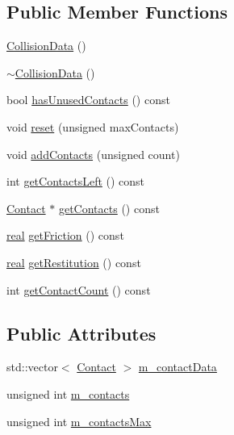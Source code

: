 \subsection*{Public Member Functions}
\begin{DoxyCompactItemize}
\item 
\mbox{\hyperlink{classrum_1_1_collision_data_a048dec3ce6286f05820891677d7ea538}{Collision\+Data}} ()
\item 
\mbox{\hyperlink{classrum_1_1_collision_data_a265a1471d472b1ef5994d3ede901643b}{$\sim$\+Collision\+Data}} ()
\item 
bool \mbox{\hyperlink{classrum_1_1_collision_data_a00b88f3e835fc6b3dd48739c518aa66f}{has\+Unused\+Contacts}} () const
\item 
void \mbox{\hyperlink{classrum_1_1_collision_data_ae49fabbf40a855eab3ce0003aa418253}{reset}} (unsigned max\+Contacts)
\item 
void \mbox{\hyperlink{classrum_1_1_collision_data_a6774145a5f81c49c30c5d0c7954d35d5}{add\+Contacts}} (unsigned count)
\item 
int \mbox{\hyperlink{classrum_1_1_collision_data_a2b3dcbec102ae7affab46ba19c7c4eb7}{get\+Contacts\+Left}} () const
\item 
\mbox{\hyperlink{classrum_1_1_contact}{Contact}} $\ast$ \mbox{\hyperlink{classrum_1_1_collision_data_a0b9d69450fbefbb28b0d427793cccc26}{get\+Contacts}} () const
\item 
\mbox{\hyperlink{namespacerum_a7e8cca23573d5eaead0f138cbaa4862c}{real}} \mbox{\hyperlink{classrum_1_1_collision_data_a917290357ac710e3d4e1bfce4d040495}{get\+Friction}} () const
\item 
\mbox{\hyperlink{namespacerum_a7e8cca23573d5eaead0f138cbaa4862c}{real}} \mbox{\hyperlink{classrum_1_1_collision_data_aae54080198ebe0e4700142f0ad03b344}{get\+Restitution}} () const
\item 
int \mbox{\hyperlink{classrum_1_1_collision_data_a77b0f7209d6709f8a2041722428f56d5}{get\+Contact\+Count}} () const
\end{DoxyCompactItemize}
\subsection*{Public Attributes}
\begin{DoxyCompactItemize}
\item 
std\+::vector$<$ \mbox{\hyperlink{classrum_1_1_contact}{Contact}} $>$ \mbox{\hyperlink{classrum_1_1_collision_data_a75aa5ab8e5c39a5a66a73587da306bec}{m\+\_\+contact\+Data}}
\item 
unsigned int \mbox{\hyperlink{classrum_1_1_collision_data_a490b9c04afb660a57e31ef89b4c44976}{m\+\_\+contacts}}
\item 
unsigned int \mbox{\hyperlink{classrum_1_1_collision_data_ad90a0d1cc021350821c396b4d4b10a7c}{m\+\_\+contacts\+Max}}
\end{DoxyCompactItemize}
